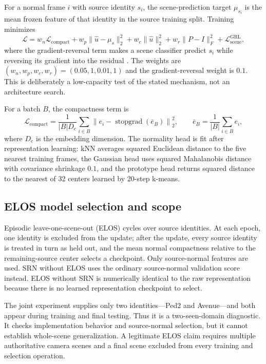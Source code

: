 For a normal frame $i$ with source identity $s_i$, the scene-prediction target $\mu_{s_i}$ is the mean frozen feature of that identity in the source training split. Training minimizes
\begin{equation}
\mathcal{L}=w_n\mathcal{L}_{\mathrm{compact}}
+w_p\lVert \hat u-\mu_s\rVert_2^2
+w_c\lVert\hat u\rVert_2^2
+w_r\lVert P-I\rVert_F^2
+\mathcal{L}_{\mathrm{scene}}^{\mathrm{GRL}},
\end{equation}
where the gradient-reversal term makes a scene classifier predict $s_i$ while reversing its gradient into the residual \citep{ganin2016domain}. The weights are $(w_n,w_p,w_c,w_r)=(0.05,1,0.01,1)$ and the gradient-reversal weight is $0.1$. This is deliberately a low-capacity test of the stated mechanism, not an architecture search.

For a batch $B$, the compactness term is
\begin{equation}
\mathcal{L}_{\mathrm{compact}}=\frac{1}{|B|D_e}
\sum_{i\in B}\left\lVert e_i-\operatorname{stopgrad}(\bar e_B)\right\rVert_2^2,
\qquad \bar e_B=\frac{1}{|B|}\sum_{i\in B}e_i,
\end{equation}
where $D_e$ is the embedding dimension. The normality head is fit after representation learning: kNN averages squared Euclidean distance to the five nearest training frames, the Gaussian head uses squared Mahalanobis distance with covariance shrinkage $0.1$, and the prototype head returns squared distance to the nearest of 32 centers learned by 20-step k-means.

\subsection{ELOS model selection and scope}

Episodic leave-one-scene-out (ELOS) cycles over source identities. At each epoch, one identity is excluded from the update; after the update, every source identity is treated in turn as held out, and the mean normal compactness relative to the remaining-source center selects a checkpoint. Only source-normal features are used. SRN without ELOS uses the ordinary source-normal validation score instead. ELOS without SRN is numerically identical to the raw representation because there is no learned representation checkpoint to select.

The joint experiment supplies only two identities---Ped2 and Avenue---and both appear during training and final testing. Thus it is a two-seen-domain diagnostic. It checks implementation behavior and source-normal selection, but it cannot establish whole-scene generalization. A legitimate ELOS claim requires multiple authoritative camera scenes and a final scene excluded from every training and selection operation.
